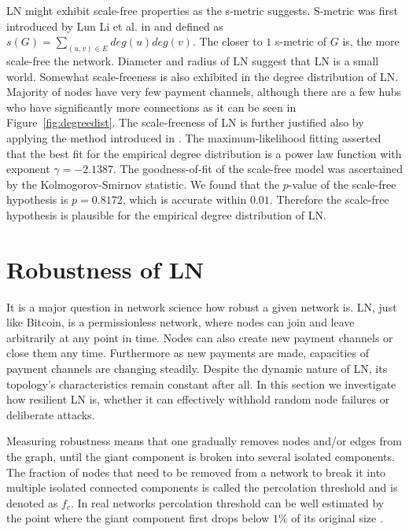 \documentclass[runningheads]{llncs}
\begin{document}
LN might exhibit scale-free properties as the s-metric suggests. S-metric was first introduced by Lun Li et al. in \cite{li2005towards} and defined as $s(G)=\sum_{(u,v)\in E}deg(u)deg(v)$. The closer to $1$  s-metric of $G$ is, the more scale-free the network. Diameter and radius of LN suggest that LN is a small world. Somewhat scale-freeness is also exhibited in the degree distribution of LN. Majority of nodes have very few payment channels, although there are a few hubs who have significantly more connections as it can be seen in Figure~\ref{fig:degreedist}. The scale-freeness of LN is further justified also by applying the method introduced in \cite{clauset2009power}. The maximum-likelihood fitting asserted that the best fit for the empirical degree distribution is a power law function with exponent $\gamma=-2.1387$. The goodness-of-fit of the scale-free model was ascertained by the Kolmogorov-Smirnov statistic. We found that the $p$-value of the scale-free hypothesis is $p=0.8172$, which is accurate within $0.01$. Therefore the scale-free hypothesis is plausible for the empirical degree distribution of LN.

\section{Robustness of LN}
It is a major question in network science how robust a given network is. LN, just like Bitcoin, is a permissionless network, where nodes can join and leave arbitrarily at any point in time. Nodes can also create new payment channels or close them any time. Furthermore as new payments are made, capacities of payment channels are changing steadily. Despite the dynamic nature of LN, its topology's characteristics remain constant after all.
In this section we investigate how resilient LN is, whether it can effectively withhold random node failures or deliberate attacks.

Measuring robustness means that one gradually removes nodes and/or edges from the graph, until the giant component is broken into several isolated components. The fraction of nodes that need to be removed from a network to break it into multiple isolated connected components is called the percolation threshold and is denoted as $f_c$. In real networks percolation threshold can be well estimated by the point where the giant component first drops below $1\%$ of its original size \cite{barabasi2016network}.  
\end{document}
